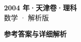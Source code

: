 \documentclass[zihao=-4, a4paper]{ctexart}
\begin{document}
\begin{center}
  {\Large\bfseries 2004 年·天津卷·理科}\\[4pt]
  {\large 数学 · 解析版}
\end{center}
\medskip
{}

\clearpage
{}
\begin{center}{\Large\bfseries 参考答案与详细解析}\end{center}
\medskip

\end{document}
